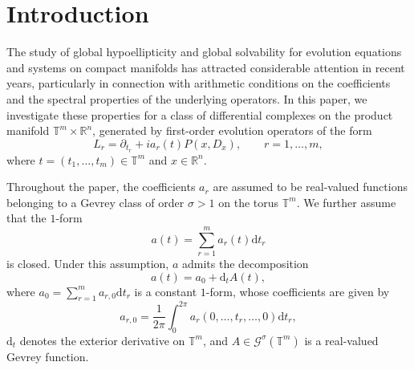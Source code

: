 \documentclass[12pt,reqno]{amsart}
\theoremstyle{definition}
\numberwithin{equation}{section}
\begin{document}
	\begin{abstract}
		We study the global solvability of a class of differential complexes on the product manifold $\mathbb{T}^m \times \mathbb{R}^n$ associated with systems of 	evolution operators of the form \(L_r = \partial_{t_r} + ia_r(t)P(x,D_x), r=1,\ldots,m,\) where the coefficients $a_r$ are real-valued Gevrey functions on the torus and $P(x,D_x)$ is a globally elliptic normal differential operator on $\mathbb{R}^n$. Within the framework of time-periodic Gelfand--Shilov spaces, we introduce a natural differential complex generated by these operators and investigate its solvability in both functional and ultradistributional settings.
		
		We provide a complete characterization of global solvability in terms of a Diophantine condition involving the constant part of the associated $1$-form and the spectrum of $P$. We also analyze global hypoellipticity of the complex. These results extend previous works on scalar operators and constant coefficient systems to the setting of differential complexes with time-dependent real coefficients.
	\end{abstract}
	

\section{Introduction}

The study of global hypoellipticity and global solvability for evolution equations and systems on compact manifolds has attracted considerable  attention in recent years, particularly in connection with arithmetic conditions on the coefficients and the spectral properties of the
underlying operators. In this paper, we investigate these properties for a class of differential
complexes on the product manifold $\mathbb{T}^m \times \mathbb{R}^n$, generated by first-order evolution
operators of the form
\begin{equation}\label{generalsystem}	
	L_r = \partial_{t_r} + ia_r(t)P(x,D_x),
	\qquad r=1,\ldots,m,
\end{equation}
where $t=(t_1,\ldots,t_m)\in\mathbb{T}^m$ and $x\in\mathbb{R}^n$.

Throughout the paper, the coefficients $a_r$ are assumed to be real-valued
functions belonging to a Gevrey class of order $\sigma>1$ on the torus
$\mathbb{T}^m$.
We further assume that the $1$-form
\[
a(t)=\sum_{r=1}^m a_r(t)\mathrm{d}t_r
\]
is closed.
Under this assumption, $a$ admits the decomposition
\[
a(t)=a_0+\mathrm{d}_t A(t),
\]
where $a_0=\sum_{r=1}^m a_{r,0}\mathrm{d}t_r$ is a constant $1$-form, whose
coefficients are given by
\begin{equation*}
	a_{r,0}=\frac{1}{2\pi}\int_0^{2\pi} a_r(0,\ldots,t_r,\ldots,0)\mathrm{d}t_r,
\end{equation*}
$\mathrm{d}_t$ denotes the exterior derivative on $\mathbb{T}^m$, and
$A\in\mathcal{G}^\sigma(\mathbb{T}^m)$ is a real-valued Gevrey function.
\end{document}
